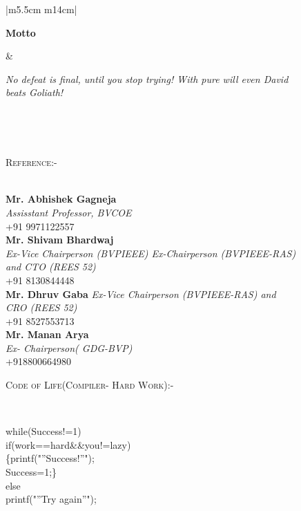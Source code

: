 \documentclass[11pt]{article}
\begin{document}
\begin{figure}[ht]
\begin{tabular}{ |m{5.5cm} m{14cm}| }
\begin{flushleft}
\textbf{{ Motto }}

\end{flushleft}&\begin{center}\textit{ No defeat is final, until you stop trying! With pure will even David beats Goliath! }\end{center}\\

\hline
\end{tabular}\\
\vspace{5mm}
\begin{minipage}[b]{0.45\linewidth}
\flushleft
\noindent\colorbox{WeakOrange}
{\parbox{\dimexpr\textwidth-2\fboxsep\relax}{\textsc{Reference:-}}}\\
\vspace{3mm}
\textbf{Mr. Abhishek Gagneja}\\
\textit{Assisstant Professor, BVCOE}\\
+91 9971122557\\
\vspace{3mm}
\textbf{Mr. Shivam Bhardwaj}\\
\textit{ Ex-Vice Chairperson (BVPIEEE) Ex-Chairperson (BVPIEEE-RAS) and CTO (REES 52)}\\
+91 8130844448\\
\vspace{3mm}
\textbf{Mr. Dhruv Gaba}
\textit{ Ex-Vice Chairperson (BVPIEEE-RAS) and CRO (REES 52)}\\
+91 8527553713\\
\vspace{3mm}
\textbf{Mr. Manan Arya}\\
\textit{Ex- Chairperson( GDG-BVP)}\\
+918800664980\\

\end{minipage}
\begin{minipage}[b]{0.45\linewidth}
\flushleft
\noindent\colorbox{WeakOrange}
{\parbox{\dimexpr\textwidth-2\fboxsep\relax}{\textsc{Code of Life(Compiler- Hard Work):-}}}\\
\vspace{4mm}
\begin{large}
while(Success!=1)\\
\vspace{3mm}
{ if(work==hard\&\&you!=lazy)\\
\vspace{3mm}
\hspace{2mm}      \{printf("”Success!”");\\
\vspace{3mm}
\hspace{2mm}        Success=1;\}\\
\vspace{3mm}
else\\
\vspace{3mm}
\hspace{2mm}      printf("”Try again”"); }\\
\vspace{2.35cm}


\end{large}
\end{minipage}
\end{figure}
\end{document}
